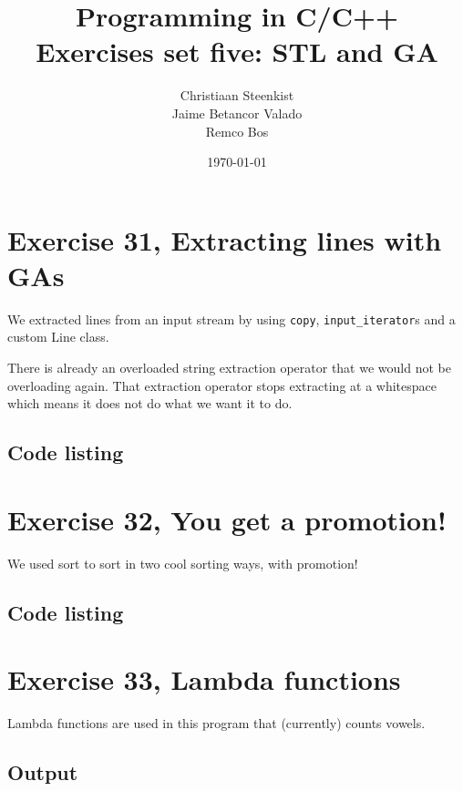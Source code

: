 \documentclass[11pt]{article}
\begin{document}
\title{Programming in C/C++ \\
       Exercises set five: STL and GA
}
\date{\today}
\author{Christiaan Steenkist \\
Jaime Betancor Valado \\
Remco Bos \\
}

\maketitle

\section*{Exercise 31, Extracting lines with GAs}
We extracted lines from an input stream by using \texttt{copy}, \texttt{input\_iterator}s and a custom Line class.

There is already an overloaded string extraction operator that we would not be overloading again.
That extraction operator stops extracting at a whitespace which means it does not do what we want it to do.

\subsection*{Code listing}


\section*{Exercise 32, You get a promotion!}
We used sort to sort in two cool sorting ways, with promotion!

\subsection*{Code listing}


\section*{Exercise 33, Lambda functions}
Lambda functions are used in this program that (currently) counts vowels.

\subsection*{Output}

\end{document}
